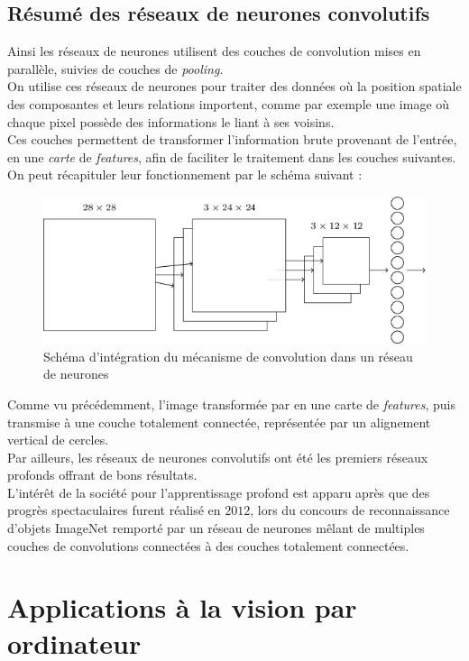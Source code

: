 \documentclass[10pt,a4paper]{report}
\begin{document}
		\subsection{Résumé des réseaux de neurones convolutifs}
		Ainsi les réseaux de neurones utilisent des couches de convolution mises en parallèle, suivies de couches de \emph{pooling}.\\
		On utilise ces réseaux de neurones pour traiter des données où la position spatiale des composantes et leurs relations importent, comme par exemple une image où chaque pixel possède des informations le liant à ses voisins.\\
		Ces couches permettent de transformer l'information brute provenant de l'entrée, en une \emph{carte} de \emph{features}, afin de faciliter le traitement dans les couches suivantes.\\
		On peut récapituler leur fonctionnement par le schéma suivant :
		\begin{figure}[H]
			\begin{center}
				\includegraphics[scale=0.6]{Images/fullconvnetwork.png}
				\caption{Schéma d'intégration du mécanisme de convolution dans un réseau de neurones}
			\end{center}
		\end{figure}
		Comme vu précédemment, l'image transformée par en une carte de \emph{features}, puis transmise à une couche totalement connectée, représentée par un alignement vertical de cercles.\\
		Par ailleurs, les réseaux de neurones convolutifs ont été les premiers réseaux profonds offrant de bons résultats.\\
		L'intérêt de la société pour l'apprentissage profond est apparu après que des progrès spectaculaires furent réalisé en $2012$, lors du concours de reconnaissance d'objets ImageNet remporté par un réseau de neurones mêlant de multiples couches de convolutions connectées à des couches totalement connectées.
		\section{Applications à la vision par ordinateur}
\end{document}
